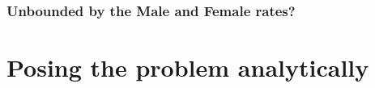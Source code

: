 \subsection{Unbounded by the Male and Female rates?}
 
  

  

 
 
 \chapter{Posing the problem analytically}
 \label{chap:Posing}
 
\startappendices


 \label{app:Appendix1}
 
 
 
 
 
 
 \nocite{*} %
\startbibliography
 \begin{singlespace} %
 \end{singlespace}


